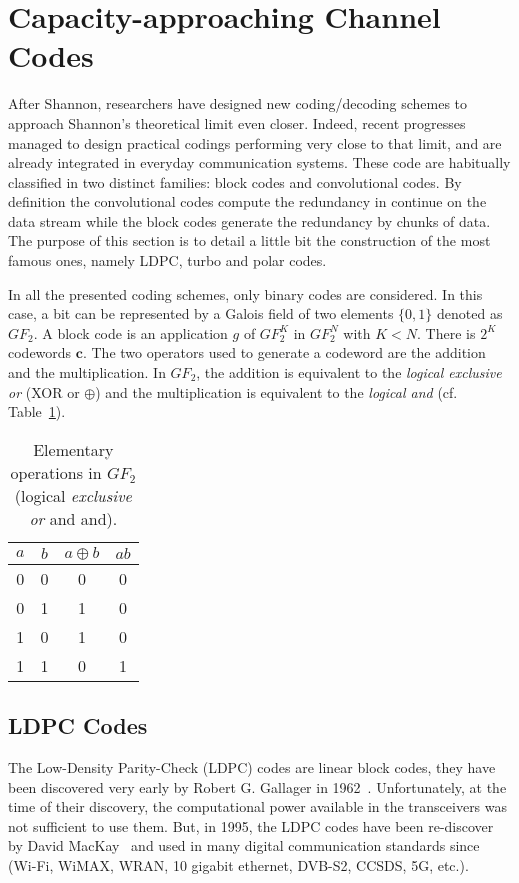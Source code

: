 \section{Capacity-approaching Channel Codes}

After Shannon, researchers have designed new coding/decoding schemes to approach
Shannon's theoretical limit even closer. Indeed, recent progresses managed to
design practical codings performing very close to that limit, and are already
integrated in everyday communication systems. These code are habitually
classified in two distinct families: block codes and convolutional codes. By
definition the convolutional codes compute the redundancy in continue on the
data stream while the block codes generate the redundancy by chunks of data.
The purpose of this section is to detail a little bit the construction of the
most famous ones, namely LDPC, turbo and polar codes.

In all the presented coding schemes, only binary codes are considered. In this
case, a bit can be represented by a Galois field of two elements $\{0, 1\}$
denoted as $GF_2$. A block code is an application $g$ of $GF_2^K$ in $GF_2^N$
with $K < N$. There is $2^K$ codewords $\bm{c}$. The two operators used to generate
a codeword are the addition and the multiplication. In $GF_2$, the addition is
equivalent to the \emph{logical exclusive or} (XOR or $\oplus$) and the
multiplication is equivalent to the \emph{logical and} (cf.
Table~\ref{tab:ctx_gf2_operations}).

\begin{table}[htp]
  \centering
  \caption{Elementary operations in $GF_2$ (logical \emph{exclusive or} and
    {and}).}
  \label{tab:ctx_gf2_operations}
   \begin{tabular}{c c c c}
   $a$ & $b$ & $a \oplus b$ & $ab$ \\
    \hline
    \hline
    0 & 0 & 0 & 0 \\
    0 & 1 & 1 & 0 \\
    1 & 0 & 1 & 0 \\
    1 & 1 & 0 & 1 \\
  \end{tabular}
\end{table}

\subsection{LDPC Codes}

The Low-Density Parity-Check (LDPC) codes are linear block codes, they have been
discovered very early by Robert G. Gallager in 1962~\cite{Gallager1962}.
Unfortunately, at the time of their discovery, the computational power available
in the transceivers was not sufficient to use them. But, in 1995, the LDPC codes
have been re-discover by David MacKay~\cite{MacKay1995} and used in many digital
communication standards since (Wi-Fi, WiMAX, WRAN, 10 gigabit ethernet, DVB-S2,
CCSDS, 5G, etc.).

